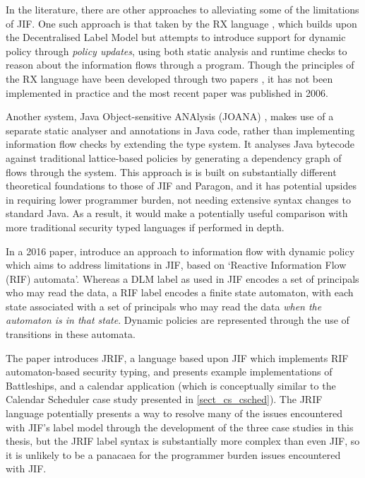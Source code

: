 In the literature, there are other approaches to alleviating some of the limitations of JIF. One such approach is that taken by the RX language \cite{swamy06rx}, which builds upon the Decentralised Label Model but attempts to introduce support for dynamic policy through \textit{policy updates}, using both static analysis and runtime checks to reason about the information flows through a program. Though the principles of the RX language have been developed through two papers \cite{swamy06rx} \cite{hicks05rx}, it has not been implemented in practice and the most recent paper was published in 2006.

Another system, Java Object-sensitive ANAlysis (JOANA) \cite{graf2013joana}, makes use of a separate static analyser and annotations in Java code, rather than implementing information flow checks by extending the type system. It analyses Java bytecode against traditional lattice-based policies by generating a dependency graph of flows through the system. This approach is is built on substantially different theoretical foundations to those of JIF and Paragon, and it has potential upsides in requiring lower programmer burden, not needing extensive syntax changes to standard Java. As a result, it would make a potentially useful comparison with more traditional security typed languages if performed in depth.

In a 2016 paper, \citeauthor{kozyri2016jrif} \cite{kozyri2016jrif} introduce an approach to information flow with dynamic policy which aims to address limitations in JIF, based on `Reactive Information Flow (RIF) automata'. Whereas a DLM label as used in JIF encodes a set of principals who may read the data, a RIF label encodes a finite state automaton, with each state associated with a set of principals who may read the data \textit{when the automaton is in that state}. Dynamic policies are represented through the use of transitions in these automata.

The paper \cite{kozyri2016jrif} introduces JRIF, a language based upon JIF which implements RIF automaton-based security typing, and presents example implementations of Battleships, and a calendar application (which is conceptually similar to the Calendar Scheduler case study presented in \ref{sect_cs_csched}). The JRIF language potentially presents a way to resolve many of the issues encountered with JIF's label model through the development of the three case studies in this thesis, but the JRIF label syntax is substantially more complex than even JIF, so it is unlikely to be a panacaea for the programmer burden issues encountered with JIF.

